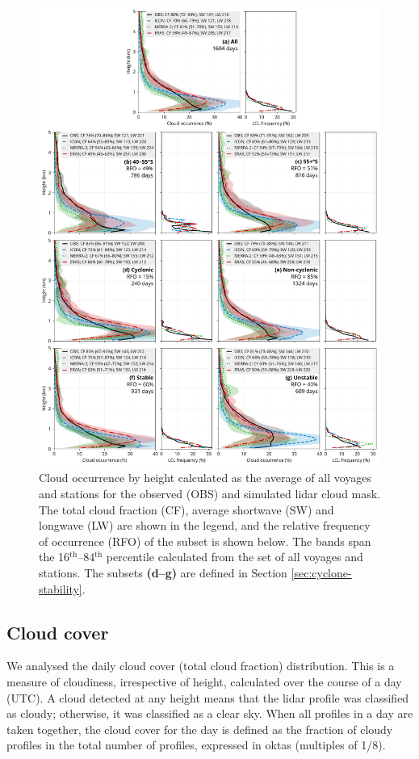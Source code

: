 \documentclass[12pt,a4paper]{article}
\begin{document}
\begin{figure}[p!]
\centering
\includegraphics[width=\textwidth]{img/cl_agg.pdf}
\caption{
Cloud occurrence by height calculated as the average of all voyages and
stations for the observed (OBS) and simulated lidar cloud mask. The total cloud
fraction (CF), average shortwave (SW) and longwave (LW) are shown in the
legend, and the relative frequency of occurrence (RFO) of the subset is shown
below.  The bands span the 16$^\mathrm{th}$--84$^\mathrm{th}$ percentile
calculated from the set of all voyages and stations. The subsets
\textbf{(d--g)} are defined in Section \ref{sec:cyclone-stability}.
}
\label{fig:cloud-occurrence}
\end{figure}

\subsection{Cloud cover}

We analysed the daily cloud cover (total cloud fraction) distribution. This is
a measure of cloudiness, irrespective of height, calculated over the course of
a day (UTC). A cloud detected at any height means that the lidar profile was
classified as cloudy; otherwise, it was classified as a clear sky. When all
profiles in a day are taken together, the cloud cover for the day is defined as
the fraction of cloudy profiles in the total number of profiles, expressed in
oktas (multiples of 1/8).
\end{document}
